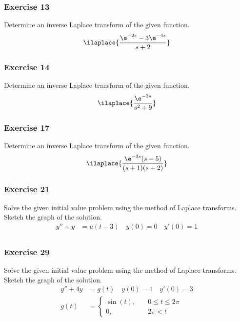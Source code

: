 \documentclass{math}
\begin{document}
\subsubsection*{Exercise 13}
Determine an inverse Laplace transform of the given function.
\begin{align*}
  \ilaplace{\frac{\e^{-2s}-3\e^{-4s}}{s+2}}
\end{align*}

\subsubsection*{Exercise 14}
Determine an inverse Laplace transform of the given function.
\begin{align*}
  \ilaplace{\frac{\e^{-3s}}{s^2+9}}
\end{align*}

\subsubsection*{Exercise 17}
Determine an inverse Laplace transform of the given function.
\begin{align*}
  \ilaplace{\frac{\e^{-3s}(s-5)}{(s+1)(s+2)}}
\end{align*}

\subsubsection*{Exercise 21}
Solve the given initial value problem using the method of Laplace transforms.
Sketch the graph of the solution.
\begin{align*}
  y''+y &= u(t-3) \quad y(0) = 0 \quad y'(0) = 1 \\
\end{align*}

\subsubsection*{Exercise 29}
Solve the given initial value problem using the method of Laplace transforms.
Sketch the graph of the solution.
\begin{align*}
  y''+4y &= g(t) \quad y(0) = 1 \quad y'(0) = 3 \\
  g(t) &= \begin{cases}
    \sin(t), &\quad 0\le t\le 2\pi \\
    0, &\quad 2\pi<t
  \end{cases}
\end{align*}
\end{document}
